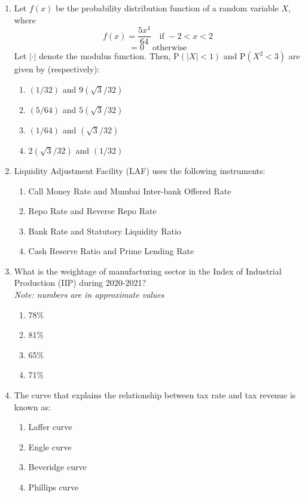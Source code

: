 \documentclass[journal,12pt,onecolumn]{exam}
\theoremstyle{remark}
\begin{document}
\begin{enumerate}
  \item Let \(f(x)\) be the probability distribution function of a random variable \(X\), where
  \[
  f(x) = \frac{5x^4}{64} \quad \text{if } -2 < x < 2
  \]
  \[
  = 0 \quad \text{otherwise}
  \]
  Let \(|\cdot|\) denote the modulus function. Then, \(\mathrm{P}(|X| < 1)\) and \(\mathrm{P}(X^2 < 3)\) are given by (respectively):
  \begin{enumerate}
    \item \((1/32)\) and \(9(\sqrt{3}/32)\)
    \item \((5/64)\) and \(5(\sqrt{3}/32)\)
    \item \((1/64)\) and \((\sqrt{3}/32)\)
    \item \(2(\sqrt{3}/32)\) and \((1/32)\)
  \end{enumerate}
\item Liquidity Adjustment Facility (LAF) uses the following instruments:
  \begin{enumerate}
    \item Call Money Rate and Mumbai Inter-bank Offered Rate
    \item Repo Rate and Reverse Repo Rate
    \item Bank Rate and Statutory Liquidity Ratio
    \item Cash Reserve Ratio and Prime Lending Rate
  \end{enumerate}

  \item What is the weightage of manufacturing sector in the Index of Industrial Production (IIP) during 2020-2021? \\
  \textit{Note: numbers are in approximate values}
  \begin{enumerate}
    \item 78\%
    \item 81\%
    \item 65\%
    \item 71\%
\end{enumerate}

 \item The curve that explains the relationship between tax rate and tax revenue is known as:
  \begin{enumerate}
    \item Laffer curve
    \item Engle curve
    \item Beveridge curve
    \item Phillips curve
  \end{enumerate}


\end{enumerate}
\end{document}

